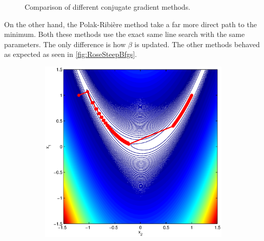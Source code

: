 \documentclass[12pt,parskip=full]{article}
\numberwithin{subsection}{section}
\begin{document}
\begin{figure}[!ht]
\begin{subfigure}[h]{0.4\textwidth}
			\end{subfigure}
			\caption{Comparison of different conjugate gradient methods.\label{fig:RoseConjGradComp}}
		\end{figure}
		
		On the other hand, the Polak-Ribi\`{e}re method take a far more direct path to the minimum. Both
		these methods use the exact same line search with the same parameters. The only difference
		is how $\beta$ is updated. The other methods behaved as expected as seen in \cref{fig:RoseSteepBfgs}.

		\begin{figure}[!ht]
			\centering
			\begin{subfigure}[h]{0.4\textwidth}
				\includegraphics[width=\textwidth]{SteepestRose.eps}
			\end{subfigure}
			\begin{subfigure}[h]{0.4\textwidth}

\end{subfigure}
\end{figure}
\end{document}
